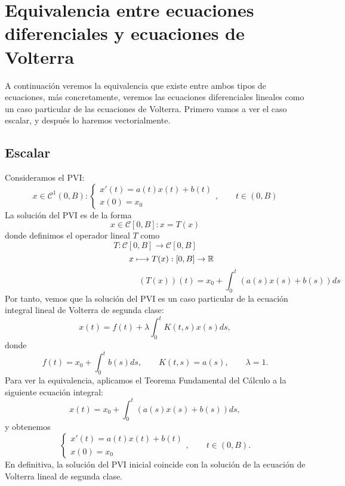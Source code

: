 \chapter{Equivalencia entre ecuaciones diferenciales y ecuaciones de Volterra}
A continuación veremos la equivalencia que existe entre ambos tipos de ecuaciones, más concretamente, veremos las ecuaciones diferenciales lineales como un caso particular de las ecuaciones de Volterra. Primero vamos a ver el caso escalar, y después lo haremos vectorialmente.
\section{Escalar}
Consideramos el PVI:
\begin{equation}
	x \in \mathcal{C}^1(0,B):\left\lbrace\begin{array}{c} x'(t) = a(t)x(t)+b(t) \\ x(0) = x_0 \end{array}\right.,\qquad t \in (0,B)
\end{equation}
La solución del PVI es de la forma
\begin{equation}
	x \in \mathcal{C}[0,B]: x = T(x)
\end{equation}
donde definimos el operador lineal $T$ como
\begin{equation}
	T: \mathcal{C}[0,B] \longrightarrow \mathcal{C}[0,B]
\end{equation}
\begin{equation}
	\qquad \qquad x \longmapsto T(x): [0,B] \rightarrow \mathbb{R}
\end{equation}
\begin{equation}
	\qquad \qquad \qquad \qquad \qquad \qquad \qquad \qquad (T(x))(t) = x_0 + \int_0^t(a(s)x(s)+b(s))ds
\end{equation}
Por tanto, vemos que la solución del PVI es un caso particular de la ecuación integral lineal de Volterra de segunda clase:
\begin{equation}
	x(t) = f(t) + \lambda \int_0^t K(t,s)x(s)ds,
\end{equation}
donde
\begin{equation}
	f(t) = x_0 + \int_0^t b(s)ds, \qquad K(t,s) = a(s), \qquad \lambda = 1.
\end{equation}
Para ver la equivalencia, aplicamos el Teorema Fundamental del Cálculo a la siguiente ecuación integral:
\begin{equation}
	x(t) = x_0 + \int_0^t (a(s)x(s)+b(s))ds,
\end{equation}
y obtenemos
\begin{equation}
	\left\lbrace\begin{array}{c} x'(t) = a(t)x(t)+b(t) \\ x(0) = x_0 \end{array}\right.,\qquad t \in (0,B).
\end{equation}
En definitiva, la solución del PVI inicial coincide con la solución de la ecuación de Volterra lineal de segunda clase.
